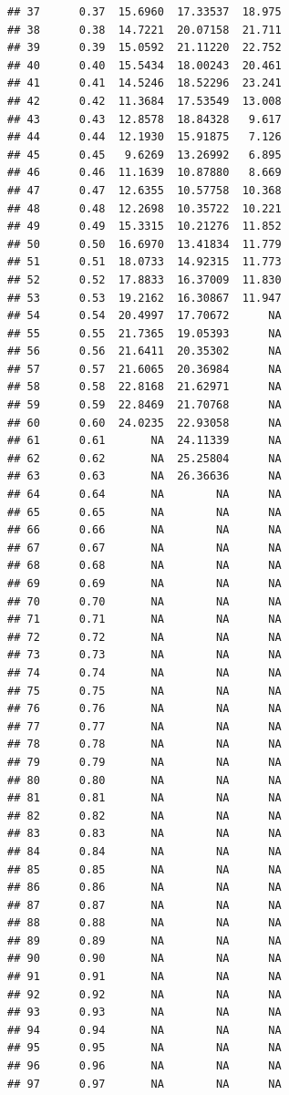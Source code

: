 \documentclass{article}\usepackage[]{graphicx}\usepackage[]{color}
\makeatletter
\newenvironment{kframe}{%
 \def\at@end@of@kframe{}%
 \ifinner\ifhmode%
  \def\at@end@of@kframe{\end{minipage}}%
  \begin{minipage}{\columnwidth}%
 \fi\fi%
 \def\FrameCommand##1{\hskip\@totalleftmargin \hskip-\fboxsep
 \colorbox{shadecolor}{##1}\hskip-\fboxsep
     \hskip-\linewidth \hskip-\@totalleftmargin \hskip\columnwidth}%
 \MakeFramed {\advance\hsize-\width
   \@totalleftmargin\z@ \linewidth\hsize
   \@setminipage}}%
 {\par\unskip\endMakeFramed%
 \at@end@of@kframe}
\newenvironment{knitrout}{}{} %
\makeatother
\begin{document}
\begin{knitrout}
\begin{kframe}
\begin{verbatim}
## 37      0.37  15.6960  17.33537  18.975
## 38      0.38  14.7221  20.07158  21.711
## 39      0.39  15.0592  21.11220  22.752
## 40      0.40  15.5434  18.00243  20.461
## 41      0.41  14.5246  18.52296  23.241
## 42      0.42  11.3684  17.53549  13.008
## 43      0.43  12.8578  18.84328   9.617
## 44      0.44  12.1930  15.91875   7.126
## 45      0.45   9.6269  13.26992   6.895
## 46      0.46  11.1639  10.87880   8.669
## 47      0.47  12.6355  10.57758  10.368
## 48      0.48  12.2698  10.35722  10.221
## 49      0.49  15.3315  10.21276  11.852
## 50      0.50  16.6970  13.41834  11.779
## 51      0.51  18.0733  14.92315  11.773
## 52      0.52  17.8833  16.37009  11.830
## 53      0.53  19.2162  16.30867  11.947
## 54      0.54  20.4997  17.70672      NA
## 55      0.55  21.7365  19.05393      NA
## 56      0.56  21.6411  20.35302      NA
## 57      0.57  21.6065  20.36984      NA
## 58      0.58  22.8168  21.62971      NA
## 59      0.59  22.8469  21.70768      NA
## 60      0.60  24.0235  22.93058      NA
## 61      0.61       NA  24.11339      NA
## 62      0.62       NA  25.25804      NA
## 63      0.63       NA  26.36636      NA
## 64      0.64       NA        NA      NA
## 65      0.65       NA        NA      NA
## 66      0.66       NA        NA      NA
## 67      0.67       NA        NA      NA
## 68      0.68       NA        NA      NA
## 69      0.69       NA        NA      NA
## 70      0.70       NA        NA      NA
## 71      0.71       NA        NA      NA
## 72      0.72       NA        NA      NA
## 73      0.73       NA        NA      NA
## 74      0.74       NA        NA      NA
## 75      0.75       NA        NA      NA
## 76      0.76       NA        NA      NA
## 77      0.77       NA        NA      NA
## 78      0.78       NA        NA      NA
## 79      0.79       NA        NA      NA
## 80      0.80       NA        NA      NA
## 81      0.81       NA        NA      NA
## 82      0.82       NA        NA      NA
## 83      0.83       NA        NA      NA
## 84      0.84       NA        NA      NA
## 85      0.85       NA        NA      NA
## 86      0.86       NA        NA      NA
## 87      0.87       NA        NA      NA
## 88      0.88       NA        NA      NA
## 89      0.89       NA        NA      NA
## 90      0.90       NA        NA      NA
## 91      0.91       NA        NA      NA
## 92      0.92       NA        NA      NA
## 93      0.93       NA        NA      NA
## 94      0.94       NA        NA      NA
## 95      0.95       NA        NA      NA
## 96      0.96       NA        NA      NA
## 97      0.97       NA        NA      NA

\end{verbatim}
\end{kframe}
\end{knitrout}
\end{document}
